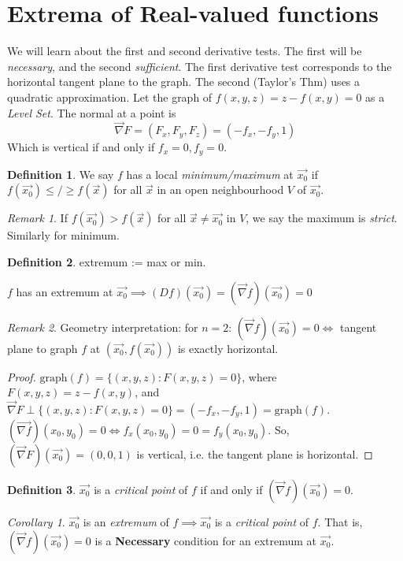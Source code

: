 \documentclass[12pt]{book}
\theoremstyle{definition}
\newtheorem{definition}{Definition}[section]
\theoremstyle{remark}
\newtheorem*{remark}{Remark}
\newtheorem{corollary}{Corollary}[theorem]
\begin{document}
\section{Extrema of Real-valued functions}%
  \label{sub:Extrema of real-valued functions}
  We will learn about the first and second derivative tests. The first will be \textit{necessary}, and the second \textit{sufficient}. The first derivative test corresponds to the horizontal tangent plane to the graph. The second (Taylor's Thm) uses a quadratic approximation. 
  \newline 
  Let the graph of $f(x,y,z)=z - f(x,y) = 0$ as a \textit{Level Set}. The normal at a point is $$\vec{{\nabla}} F =  ( F_x, F_y , F_z) = ( -f_x, -f_y,1)$$
  Which is vertical if and only if $f_x = 0, f_y = 0$. 

  \begin{definition} We say $f$ has a local \textit{ minimum/maximum} at $\vec{{x_0}}$ if $f(\vec{{x_0}}) \leq / \geq f(\vec{{x}})$ for all $\vec{{x}}$ in an open neighbourhood $V$ of $\vec{{x_0}}$.   
    
  \end{definition}
  \begin{remark}
    If $f(\vec{{x_0}}) > f(\vec{{x}})$ for all $\vec{{x}} \neq \vec{x_0}$ in $V$, we say the maximum is \textit{strict}. Similarly for minimum.
  \end{remark}
  \begin{definition}extremum := max or min.
    
  \end{definition}
  \begin{proposition} 
    $f$ has an extremum at $\vec{{x_0}} \implies (Df)(\vec{{x_0}}) = (\vec{{\nabla}}f)(\vec{{x_0}}) = 0$ 
  \end{proposition}
  \begin{remark}
    Geometry interpretation: for $n= 2$: $(\vec{{\nabla}}f ) (\vec{{x_0}}) = 0 \iff$ tangent plane to graph $f$ at $(\vec{{x_0}} , f(\vec{x_0}))$ is exactly horizontal. 
    \begin{proof} 
      $\text{graph} (f) = \{ (x,y,z)  : F(x,y,z) = 0\}$, where $F(x,y,z) = z- f(x,y)$, and $\vec{{\nabla}} F \perp \{ (x,y,z)  : F(x,y,z) = 0\} = (-f_x , -f_y, 1) = \text{graph}(f)$. $(\vec{{\nabla} f})(x_0, y_0) = 0 \iff f_x (x_0, y_0) = 0 = f_y (x_0, y_0)$. So, $(\vec{{\nabla}}F) (\vec{x_0})= (0,0,1)$ is vertical, i.e. the tangent plane is horizontal. 
    \end{proof}
  \end{remark}
  \begin{definition}$\vec{{x_0}} $ is a \textit{critical point} of $f$ if and only if $(\vec{{\nabla}} f) (\vec{{x_0}}) = 0$. 
    
  \end{definition}
  \begin{corollary}$\vec{{x_0}} $ is an \textit{extremum} of $f\implies \vec{{x_0}}$ is a \textit{critical point} of $f$. That is, $(\vec{{\nabla}} f) (\vec{{x_0}} ) = 0$ is a \textbf{Necessary} condition for an extremum at $\vec{{x_0}}$. 

  \end{corollary}
\end{document}
